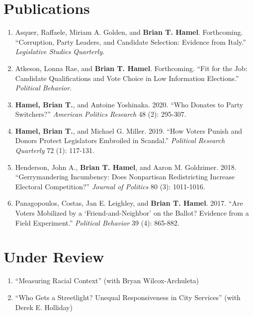 \documentclass[12pt]{article}
\begin{document}
\section*{Publications}

\begin{enumerate}[topsep = 0pt, itemsep = 1ex, partopsep  = 1ex, parsep = 1ex]

	\item[] Asquer, Raffaele, Miriam A. Golden, and \textbf{Brian T. Hamel}. Forthcoming. ``Corruption, Party Leaders, and Candidate Selection: Evidence from Italy.'' \textit{Legislative Studies Quarterly}.
	
	\item[] Atkeson, Lonna Rae, and \textbf{Brian T. Hamel}. Forthcoming. ``Fit for the Job: Candidate Qualifications and Vote Choice in Low Information Elections.'' \textit{Political Behavior}.
	
	\item[] \textbf{Hamel, Brian T.}, and Antoine Yoshinaka. 2020. ``Who Donates to Party Switchers?'' \textit{American Politics Research} 48 (2): 295-307.

	\item[] \textbf{Hamel, Brian T.}, and Michael G. Miller. 2019. ``How Voters Punish and Donors Protect Legislators Embroiled in Scandal.'' \textit{Political Research Quarterly} 72 (1): 117-131.

	\item[] Henderson, John A., \textbf{Brian T. Hamel}, and Aaron M. Goldzimer. 2018. ``Gerrymandering Incumbency: Does Nonpartisan Redistricting Increase Electoral Competition?'' \textit{Journal of Politics} 80 (3): 1011-1016.

	\item[] Panagopoulos, Costas, Jan E. Leighley, and \textbf{Brian T. Hamel}. 2017. ``Are Voters Mobilized by a `Friend-and-Neighbor' on the Ballot? Evidence from a Field Experiment.'' \textit{Political Behavior} 39 (4): 865-882.

\end{enumerate}

\section*{Under Review}

\begin{enumerate}[topsep = 0pt, itemsep = 1ex, partopsep  = 1ex, parsep = 1ex]

	\item[] ``Measuring Racial Context'' (with Bryan Wilcox-Archuleta)
	
	\item[] ``Who Gets a Streetlight? Unequal Responsiveness in City Services'' (with Derek E. Holliday)

\end{enumerate}
	
\end{document}
